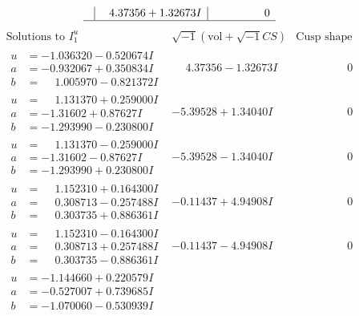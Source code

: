 \documentclass[1p]{elsarticle_modified}
\theoremstyle{definition}
\newcommand{\I}{\sqrt{-1}}
\begin{document}
$$\begin{array}{c|c|c}
 & \phantom{-}4.37356 + 1.32673 I & \phantom{-0.000000 } 0\\
 \hline 
 \end{array}$$\newpage$$\begin{array}{c|c|c}  
\text{Solutions to }I^u_{1}& \I (\text{vol} + \sqrt{-1}CS) & \text{Cusp shape}\\
 \hline 
\begin{aligned}
u &= -1.036320 - 0.520674 I \\
a &= -0.932067 + 0.350834 I \\
b &= \phantom{-}1.005970 - 0.821372 I\end{aligned}
 & \phantom{-}4.37356 - 1.32673 I & \phantom{-0.000000 } 0 \\ \hline\begin{aligned}
u &= \phantom{-}1.131370 + 0.259000 I \\
a &= -1.31602 + 0.87627 I \\
b &= -1.293990 - 0.230800 I\end{aligned}
 & -5.39528 + 1.34040 I & \phantom{-0.000000 } 0 \\ \hline\begin{aligned}
u &= \phantom{-}1.131370 - 0.259000 I \\
a &= -1.31602 - 0.87627 I \\
b &= -1.293990 + 0.230800 I\end{aligned}
 & -5.39528 - 1.34040 I & \phantom{-0.000000 } 0 \\ \hline\begin{aligned}
u &= \phantom{-}1.152310 + 0.164300 I \\
a &= \phantom{-}0.308713 - 0.257488 I \\
b &= \phantom{-}0.303735 + 0.886361 I\end{aligned}
 & -0.11437 + 4.94908 I & \phantom{-0.000000 } 0 \\ \hline\begin{aligned}
u &= \phantom{-}1.152310 - 0.164300 I \\
a &= \phantom{-}0.308713 + 0.257488 I \\
b &= \phantom{-}0.303735 - 0.886361 I\end{aligned}
 & -0.11437 - 4.94908 I & \phantom{-0.000000 } 0 \\ \hline\begin{aligned}
u &= -1.144660 + 0.220579 I \\
a &= -0.527007 + 0.739685 I \\
b &= -1.070060 - 0.530939 I\end{aligned}

\end{array}$$
\end{document}
